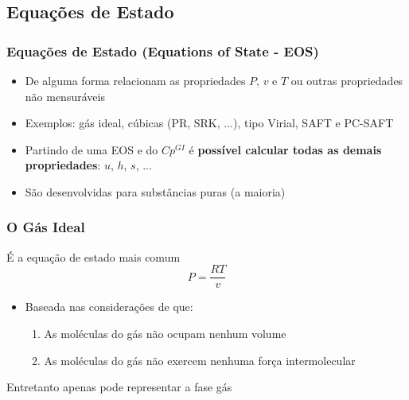 \documentclass[aspectratio=169]{beamer}
\begin{document}
\subsection{Equações de Estado}

\begin{frame}
	\frametitle{Equações de Estado (Equations of State - EOS)}
	\begin{itemize}
		\item De alguma forma relacionam as propriedades $P$, $v$ e $T$ ou
		outras propriedades não mensuráveis
		\item Exemplos: gás ideal, cúbicas (PR, SRK, ...), tipo Virial, SAFT e
		PC-SAFT
		\item Partindo de uma EOS e do $Cp^{GI}$ é \textbf{possível calcular todas
		as demais propriedades}: $u$, $h$, $s$, ...
		\item São desenvolvidas para substâncias puras (a maioria)
	\end{itemize}
\end{frame}

\begin{frame}
	\frametitle{O Gás Ideal}
	É a equação de estado mais comum
	\begin{equation*}
	P=\frac{RT}{v}
	\end{equation*}
	\begin{itemize}
	  \item Baseada nas considerações de que:
	  \begin{enumerate}
	    \item As moléculas do gás não ocupam nenhum volume
	    \item As moléculas do gás não exercem nenhuma força
		intermolecular
	  \end{enumerate}
	\end{itemize}
	Entretanto apenas pode representar a fase gás
\end{frame}
\end{document}
